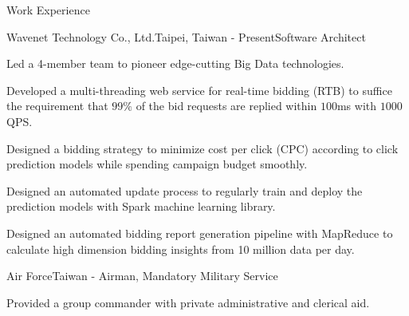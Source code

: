\documentclass{cv}
\begin{document}

\begin{cvSection}{Work Experience}

\begin{experienceSubsection}{Wavenet Technology Co., Ltd.}{Taipei, Taiwan}{ - Present}{Software Architect}

\item Led a 4-member team to pioneer edge-cutting Big Data technologies.
\item Developed a multi-threading web service for real-time bidding (RTB) to suffice the requirement that $99\%$ of the bid requests are replied within $100$ms with $1000$ QPS.
\item Designed a bidding strategy to minimize cost per click (CPC) according to click prediction models while spending campaign budget smoothly.
\item Designed an automated update process to regularly train and deploy the prediction models with Spark machine learning library.
\item Designed an automated bidding report generation pipeline with MapReduce to calculate high dimension bidding insights from 10 million data per day.

\end{experienceSubsection}

\begin{experienceSubsection}{Air Force}{Taiwan}{ - }{Airman, Mandatory Military Service}

\item Provided a group commander with private administrative and clerical aid.


\end{experienceSubsection}
\end{cvSection}
\end{document}
